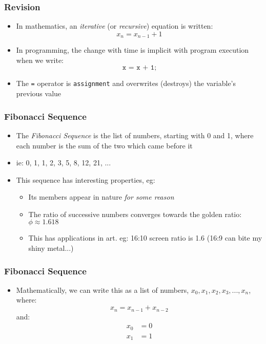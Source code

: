 \documentclass[14pt]{beamer}
\begin{document}
\begin{frame}
\frametitle{Revision}
\begin{itemize}
\item In mathematics, an \textit{iterative} (or \textit{recursive}) equation is written:
\begin{equation}
x_n = x_{n-1} + 1
\end{equation}
\item In programming, the change with time is implicit with program execution when we write:\\
\begin{equation}
\texttt{x = x + 1;}
\end{equation}
\item The \texttt{=} operator is \texttt{assignment} and overwrites (destroys) the variable's previous value
\end{itemize}
\end{frame}

\begin{frame}
\frametitle{Fibonacci Sequence}
\begin{itemize}
\item The \textit{Fibonacci Sequence} is the list of numbers, starting with 0 and 1, where each number is the sum of the two which came before it

\item ie: 0, 1, 1, 2, 3, 5, 8, 12, 21, ...

\item This sequence has interesting properties, eg:
	\begin{itemize}
		\item Its members appear in nature \textit{for some reason}
		\item The ratio of successive numbers converges towards the golden ratio: $\phi \approx 1.618$
		\item This has applications in art. eg: 16:10 screen ratio is 1.6 (16:9 can bite my shiny metal...)
	\end{itemize}
\end{itemize}
\end{frame}

\begin{frame}
\frametitle{Fibonacci Sequence}
\begin{itemize}
\item Mathematically, we can write this as a list of numbers, $x_0,x_1, x_2, x_3, ... , x_n$, where:
\begin{equation}
x_n = x_{n-1} + x_{n-2}
\end{equation}
and:
\begin{align}
x_0 &= 0\\
x_1 &= 1
\end{align}
\end{itemize}
\end{frame}
\end{document}
